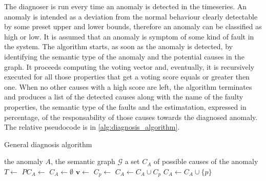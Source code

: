 The diagnoser is run every time an anomaly is detected in the timeseries. An anomaly is intended as a deviation from the normal behaviour clearly detectable by some preset upper and lower bounds, therefore an anomaly can be classified as high or low.
It is assumed that an anomaly is symptom of some kind of fault in the system. The algorithm starts, as soon as the anomaly is detected, by identifying the semantic type of the anomaly and the potential causes in the graph. It proceeds computing the voting vector and, eventually, it is recursively executed for all those properties that get a voting score equals or greater then one. When no other causes with a high score are left, the algorithm terminates and produces a list of the detected causes along with the name of the faulty properties, the semantic type of the faults and the estimatation, expressed in percentage, of the responsability of those causes towards the diagnosed anomaly. The relative pseudocode is in \autoref{alg:diagnosis_algorithm}.
\begin{algorithm}
  \caption{General diagnosis algorithm}\label{alg:diagnosis_algorithm}
  \begin{algorithmic}[1]
    \Require
      \Statex the anomaly $A$,
      \Statex the semantic graph $\mathcal{G}$
    \Ensure a set $C_A$ of possible causes of the anomaly
    \State $T\leftarrow$ 
    \State $PC_A\leftarrow$ 
    \State $C_A\leftarrow\emptyset$
    \State $\bm v\leftarrow$ 
    \State $C_p\leftarrow$  
    \State $C_A\leftarrow C_A\cup C_p$
    \Else
    \State $C_A\leftarrow C_A\cup\{p\}$ 
    \EndIf
    \EndIf
    \EndFor
    \EndProcedure
  \end{algorithmic}
\end{algorithm}
